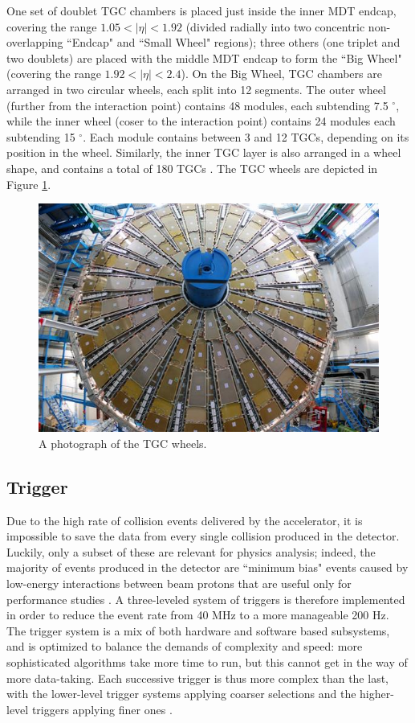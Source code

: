One set of doublet TGC chambers is placed just inside the inner MDT endcap, covering the range $ 1.05 < |\eta| <1.92 $ (divided radially into two concentric non-overlapping ``Endcap" and ``Small Wheel" regions); three others (one triplet and two doublets) are placed with the middle MDT endcap to form the ``Big Wheel" (covering the range $ 1.92 < |\eta| < 2.4$). On the Big Wheel, TGC chambers are arranged in two circular wheels, each split into 12 segments. The outer wheel (further from the interaction point) contains 48 modules, each subtending 7.5 $^{\circ}$, while the inner wheel (coser to the interaction point) contains 24 modules each subtending 15 $^{\circ}$. Each module contains between 3 and 12 TGCs, depending on its position in the wheel. Similarly, the inner TGC layer is also arranged in a wheel shape, and contains a total of 180 TGCs \cite{ATLAS_Jinst}. The TGC wheels are depicted in Figure \ref{fig:TGCWheel}.

\begin{figure}[ht!]
  \includegraphics[width=\linewidth]{figures/detector_chapter/TGCWheel.png}
  \caption{A photograph of the TGC wheels. \cite{TGCWheel}}
  \label{fig:TGCWheel}
\end{figure}

\subsection{Trigger} \label{sec:Trigger}
Due to the high rate of collision events delivered by the accelerator, it is impossible to save the data from every single collision produced in the detector. Luckily, only a subset of these are relevant for physics analysis; indeed, the majority of events produced in the detector are ``minimum bias" events caused by low-energy interactions between beam protons that are useful only for performance studies \cite{MBTS}. A three-leveled system of triggers is therefore implemented in order to reduce the event rate from 40 MHz to a more manageable 200 Hz. The trigger system is a mix of both hardware and software based subsystems, and is optimized to balance the demands of complexity and speed: more sophisticated algorithms take more time to run, but this cannot get in the way of more data-taking. Each successive trigger is thus more complex than the last, with the lower-level trigger systems applying coarser selections and the higher-level triggers applying finer ones \cite{trigger}.

